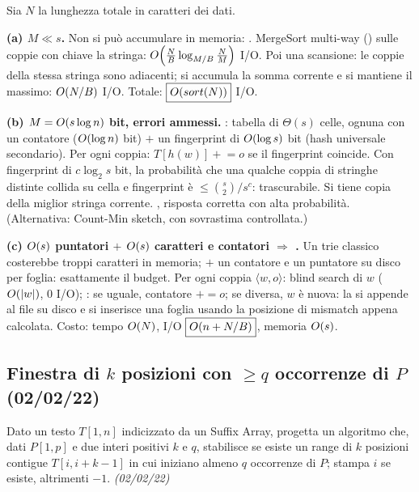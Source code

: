 Sia $N$ la lunghezza totale in caratteri dei dati.

\textbf{(a) $M\ll s$.} Non si pu\`o accumulare in memoria: . MergeSort multi-way
() sulle coppie con chiave la stringa: $O\!\left(\frac{N}{B}\log_{M/B}\frac{N}{M}\right)$ I/O. Poi
una scansione: le coppie della stessa stringa sono adiacenti; si accumula la somma corrente e si
mantiene il massimo: $O\!\left(N/B\right)$ I/O. Totale: $\boxed{O\!\left(sort(N)\right)}$ I/O.

\textbf{(b) $M=O\!\left(s\log n\right)$ bit, errori ammessi.} : tabella
di $\Theta(s)$ celle, ognuna con un contatore ($O\!\left(\log n\right)$ bit) $+$ un fingerprint di
$O\!\left(\log s\right)$ bit (hash universale secondario). Per ogni coppia: $T[h(w)]\mathrel{+}=o$ se il
fingerprint coincide. Con fingerprint di $c\log_2 s$ bit, la probabilit\`a che una qualche coppia
di stringhe distinte collida su cella e fingerprint \`e $\le\binom{s}{2}/s^{c}$: trascurabile. Si
tiene copia della miglior stringa corrente. , risposta corretta
con alta probabilit\`a. (Alternativa: Count-Min sketch, con sovrastima controllata.)

\textbf{(c) $O\!\left(s\right)$ puntatori $+$ $O\!\left(s\right)$ caratteri e contatori $\Rightarrow$ .} Un trie classico costerebbe troppi caratteri in memoria;  $+$ un contatore e un puntatore su disco per foglia:
esattamente il budget. Per ogni coppia $\langle w,o\rangle$: blind search di $w$ ($O\!\left(|w|\right)$, 0
I/O); : se uguale, contatore
$\mathrel{+}=o$; se diversa, $w$ \`e nuova: la si appende al file su disco e si inserisce una
foglia usando la posizione di mismatch appena calcolata. Costo: tempo $O\!\left(N\right)$, I/O
$\boxed{O\!\left(n+N/B\right)}$, memoria $O\!\left(s\right)$. 

\subsection*{ Finestra di $k$ posizioni con $\ge q$ occorrenze di $P$ (02/02/22)}

\begin{domanda}
Dato un testo $T[1,n]$ indicizzato da un Suffix Array, progetta un algoritmo che, dati $P[1,p]$ e
due interi positivi $k$ e $q$, stabilisce se esiste un range di $k$ posizioni contigue
$T[i,i+k-1]$ in cui iniziano almeno $q$ occorrenze di $P$; stampa $i$ se esiste, altrimenti $-1$.
\emph{(02/02/22)}
\end{domanda}

